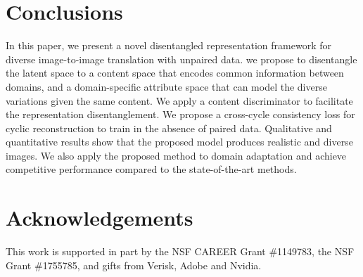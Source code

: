 \documentclass[runningheads]{llncs}
\begin{document}
\section{Conclusions}
\label{sec:conclusion}
\vspace{\secmargin}
In this paper, we present a novel disentangled representation framework for diverse image-to-image translation with unpaired data.
%
we propose to disentangle the latent space to a content space that encodes common information between domains, and a domain-specific attribute space that can model the diverse variations given the same content.
%
We apply a content discriminator to facilitate the representation disentanglement.
%
We propose a cross-cycle consistency loss for cyclic reconstruction to train in the absence of paired data.
%
Qualitative and quantitative results show that the proposed model produces realistic and diverse images.
%
We also apply the proposed method to domain adaptation and achieve competitive performance compared to the state-of-the-art methods.
%
\vspace{-1mm}
\section*{Acknowledgements}
\vspace{-3mm}
This work is supported in part by the NSF CAREER Grant \#1149783, the NSF Grant \#1755785, and gifts from Verisk, Adobe and Nvidia.

\clearpage



\end{document}
